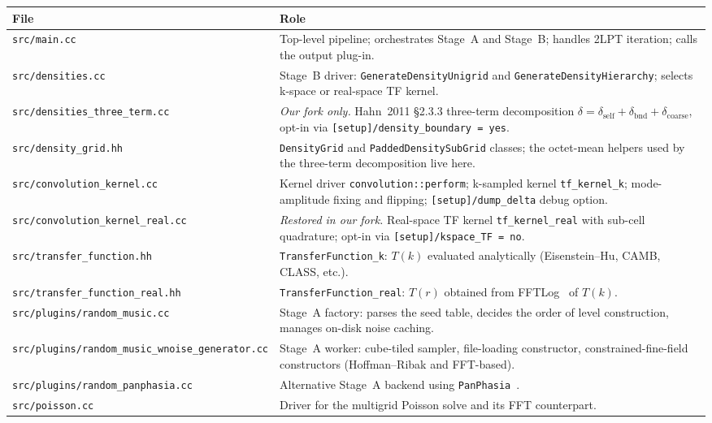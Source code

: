 \documentclass[12pt]{article}
\newcommand{\code}[1]{\texttt{#1}}
\begin{document}
\begin{table}[h]
\centering
\small
\begin{tabular}{lp{}}
\toprule
File & Role \\
\midrule
\code{src/main.cc}                & Top-level pipeline; orchestrates Stage~A and Stage~B; handles 2LPT iteration; calls the output plug-in. \\
\code{src/densities.cc}           & Stage~B driver: \code{GenerateDensityUnigrid} and \code{GenerateDensityHierarchy}; selects k-space or real-space TF kernel. \\
\code{src/densities\_three\_term.cc}  & \emph{Our fork only.}  Hahn~2011 \S2.3.3 three-term decomposition $\delta = \delta_\mathrm{self} + \delta_\mathrm{bnd} + \delta_\mathrm{coarse}$, opt-in via \code{[setup]/density\_boundary = yes}. \\
\code{src/density\_grid.hh}       & \code{DensityGrid} and \code{PaddedDensitySubGrid} classes; the octet-mean helpers used by the three-term decomposition live here. \\
\code{src/convolution\_kernel.cc} & Kernel driver \code{convolution::perform}; k-sampled kernel \code{tf\_kernel\_k}; mode-amplitude fixing and flipping; \code{[setup]/dump\_delta} debug option. \\
\code{src/convolution\_kernel\_real.cc} & \emph{Restored in our fork.}  Real-space TF kernel \code{tf\_kernel\_real} with sub-cell quadrature; opt-in via \code{[setup]/kspace\_TF = no}. \\
\code{src/transfer\_function.hh}     & \code{TransferFunction\_k}: $T(k)$ evaluated analytically (Eisenstein--Hu, CAMB, CLASS, etc.). \\
\code{src/transfer\_function\_real.hh} & \code{TransferFunction\_real}: $T(r)$ obtained from FFTLog~\citep{Hamilton2000} of $T(k)$. \\
\code{src/plugins/random\_music.cc}              & Stage~A factory: parses the seed table, decides the order of level construction, manages on-disk noise caching. \\
\code{src/plugins/random\_music\_wnoise\_generator.cc} & Stage~A worker: cube-tiled sampler, file-loading constructor, constrained-fine-field constructors (Hoffman--Ribak and FFT-based). \\
\code{src/plugins/random\_panphasia.cc}          & Alternative Stage~A backend using \texttt{PanPhasia}~\citep{Jenkins2013}. \\
\code{src/poisson.cc}             & Driver for the multigrid Poisson solve and its FFT counterpart. \\

\end{tabular}
\end{table}
\end{document}
